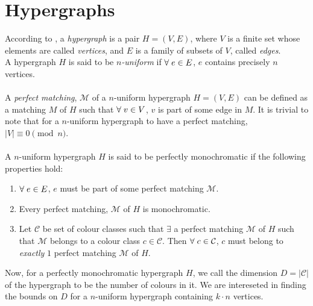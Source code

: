 \documentclass[11pt]{article}
\begin{document}
\section*{Hypergraphs}
According to \cite{10.5555/3002498}, a \textit{hypergraph} is a pair $H=(V,E)$, where $V$ is a finite set whose elements are called \textit{vertices}, and $E$ is a family of subsets of $V$, called \textit{edges}. \\
A hypergraph $H$ is said to be \textit{$n$-uniform} if $\forall \hspace{0.1cm} e \in E$, $e$ contains precisely $n$ vertices. \\\\
A \textit{perfect matching}, $\mathcal{M}$ of a $n$-uniform hypergraph $H=(V,E)$ can be defined as a matching $M$ of $H$ such that $\forall \hspace{0.1cm} v \in V$, $v$ is part of some edge in $M$. It is trivial to note that for a $n$-uniform hypergraph to have a perfect matching, $|V| \equiv 0 \pmod n$. \\ \\
A $n$-uniform hypergraph $H$ is said to be perfectly monochromatic if the following \\properties hold:
\begin{enumerate}
    \item $\forall \hspace{0.1cm} e \in E$, $e$ must be part of some perfect matching $\mathcal{M}$.
    \item Every perfect matching, $\mathcal{M}$ of $H$ is monochromatic.
    \item Let $\mathcal{C}$ be set of colour classes such that $\exists$ a perfect matching $\mathcal{M}$ of $H$ such that $\mathcal{M}$ belongs to a colour class $c \in \mathcal{C}$. Then $\forall \hspace{0.1cm} c \in \mathcal{C}$, $c$ must belong to \textit{exactly} $1$ perfect matching $\mathcal{M}$ of $H$.
\end{enumerate}
Now, for a perfectly monochromatic hypergraph $H$, we call the dimension $D=|\mathcal{C}|$ of the hypergraph to be the number of colours in it. We are intereseted in finding the bounds on $D$ for a $n$-uniform hypergraph containing $k\cdot n$ vertices.
\end{document}
